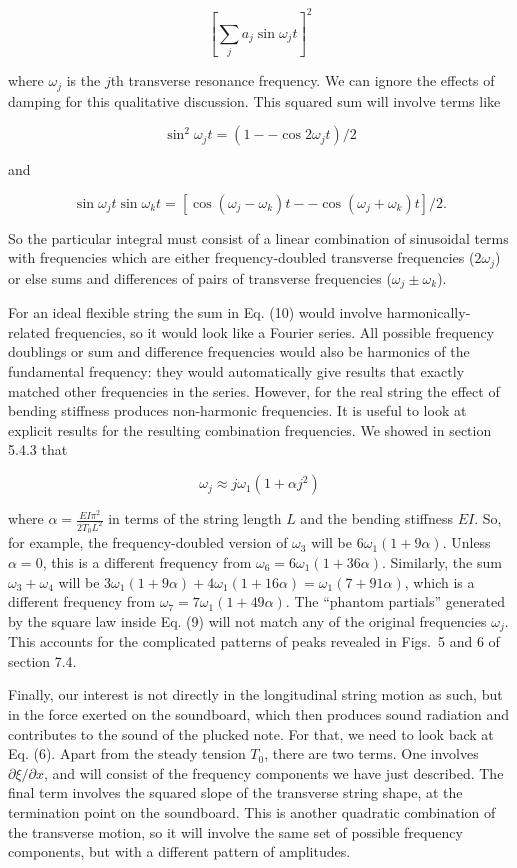   $$\left[\sum_j{a_j \sin \omega_j t} \right]^2 \tag{10}$$ 

  where $\omega_j$ is the $j$th transverse resonance frequency. We can ignore 
  the effects of damping for this qualitative discussion. This squared sum will 
  involve terms like 

  $$\sin^2 \omega_j t = (1 -- \cos 2 \omega_j t)/2 \tag{11}$$ 

  and 

  $$\sin \omega_j t \sin \omega_k t = [\cos (\omega_j -\omega_k)t -- \cos 
  (\omega_j +\omega_k)t]/2 . \tag{12}$$ 

  So the particular integral must consist of a linear combination of sinusoidal 
  terms with frequencies which are either frequency-doubled transverse 
  frequencies ($2 \omega_j$) or else sums and differences of pairs of 
  transverse frequencies ($\omega_j \pm \omega_k$). 

  For an ideal flexible string the sum in Eq. (10) would involve 
  harmonically-related frequencies, so it would look like a Fourier series. All 
  possible frequency doublings or sum and difference frequencies would also be 
  harmonics of the fundamental frequency: they would automatically give results 
  that exactly matched other frequencies in the series. However, for the real 
  string the effect of bending stiffness produces non-harmonic frequencies. It 
  is useful to look at explicit results for the resulting combination 
  frequencies. We showed in section 5.4.3 that 

  $$\omega_j \approx j \omega_1 (1+\alpha j^2) \tag{13}$$ 

  where $\alpha=\frac{EI\pi^2}{2T_0 L^2}$ in terms of the string length $L$ and 
  the bending stiffness $EI$. So, for example, the frequency-doubled version of 
  $\omega_3$ will be $6 \omega_1 (1+9 \alpha)$. Unless $\alpha = 0$, this is a 
  different frequency from $\omega_6 = 6 \omega_1 (1+36 \alpha)$. Similarly, 
  the sum $\omega_3 + \omega_4$ will be $3 \omega_1 (1+9 \alpha) + 4 
  \omega_1(1+16 \alpha) = \omega_1 (7 + 91 \alpha)$, which is a different 
  frequency from $\omega_7 = 7 \omega_1 (1+49 \alpha)$. The ``phantom 
  partials'' generated by the square law inside Eq. (9) will not match any of 
  the original frequencies $\omega_j$. This accounts for the complicated 
  patterns of peaks revealed in Figs.\ 5 and 6 of section 7.4. 

  Finally, our interest is not directly in the longitudinal string motion as 
  such, but in the force exerted on the soundboard, which then produces sound 
  radiation and contributes to the sound of the plucked note. For that, we need 
  to look back at Eq. (6). Apart from the steady tension $T_0$, there are two 
  terms. One involves $\partial \xi/\partial x$, and will consist of the 
  frequency components we have just described. The final term involves the 
  squared slope of the transverse string shape, at the termination point on the 
  soundboard. This is another quadratic combination of the transverse motion, 
  so it will involve the same set of possible frequency components, but with a 
  different pattern of amplitudes. 

